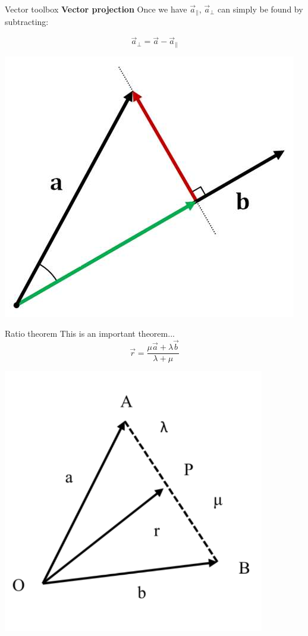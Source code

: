 \documentclass{beamer}
\begin{document}
\begin{frame}{Vector toolbox}
	\textbf{Vector projection}
	Once we have $\vec{a}_\parallel$, $\vec{a}_\perp$ can simply be found by subtracting:
	
	$$\vec{a}_\perp = \vec{a} - \vec{a}_\parallel$$
	
	\begin{center}
	\includegraphics[width=0.50 	\linewidth]{img/vector_projection.png}
	\end{center}
\end{frame}

\begin{frame}{Ratio theorem}
	This is an important theorem...
	$$\vec{r} = \dfrac{\mu\vec{a} + \lambda \vec{b}}{\lambda + \mu}$$
	\begin{center}
	\includegraphics[scale = 0.40]{img/ratio_theorem.png}
	\end{center}
\end{frame}
\end{document}
